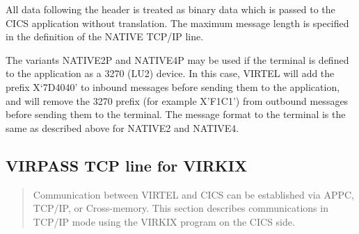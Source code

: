 \documentclass[letterpaper,10pt,english]{sphinxmanual}
\begin{document}

All data following the header is treated as binary data which is passed to the CICS application without translation. The maximum message length is specified in the definition of the NATIVE TCP/IP line.

The variants NATIVE2P and NATIVE4P may be used if the terminal is defined to the application as a 3270 (LU2) device. In this case, VIRTEL will add the prefix X‘7D4040’ to inbound messages before sending them to the application, and will remove the 3270 prefix (for example X’F1C1’) from outbound messages before sending them to the terminal. The message format to the terminal is the same as described above for NATIVE2 and NATIVE4.


\subsection{VIRPASS TCP line for VIRKIX}
\label{\detokenize{connectivity_guide:virpass-tcp-line-for-virkix}}\begin{quote}

Communication between VIRTEL and CICS can be established via APPC, TCP/IP, or Cross-memory. This section describes communications in TCP/IP mode using the VIRKIX program on the CICS side.
\end{quote}

\end{document}

